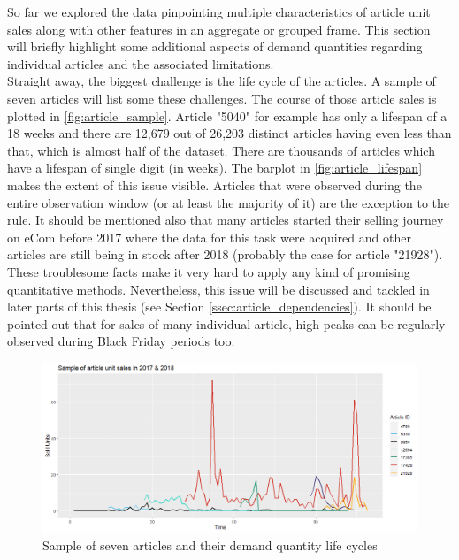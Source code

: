 

So far we explored the data pinpointing multiple characteristics of article unit sales along with other features in an aggregate or grouped frame. This section will briefly highlight some additional aspects of demand quantities regarding individual articles and the associated limitations.
\\

Straight away, the biggest challenge is the life cycle of the articles. A sample of seven articles will list some these challenges. The course of those article sales is plotted in \autoref{fig:article_sample}. Article "5040" for example has only a lifespan of a 18 weeks and there are 12,679 out of 26,203 distinct articles having even less than that, which is almost half of the dataset. There are thousands of articles which have a lifespan of single digit (in weeks). The barplot in \autoref{fig:article_lifespan} makes the extent of this issue visible. Articles that were observed during the entire observation window (or at least the majority of it) are the exception to the rule. It should be mentioned also that many articles started their selling journey on eCom before 2017 where the data for this task were acquired and other articles are still being in stock after 2018 (probably the case for article "21928"). These troublesome facts make it very hard to apply any kind of promising quantitative methods. Nevertheless, this issue will be discussed and tackled in later parts of this thesis (see Section \ref{ssec:article_dependencies}). It should be pointed out that for sales of many individual article, high peaks can be regularly observed during Black Friday periods too.
\\


\begin{figure}[H]
\centering
  \includegraphics[width=0.95\linewidth]{figures/article_sample.png}
  \caption{Sample of seven articles and their demand quantity life cycles}
  \label{fig:article_sample}
\end{figure}



